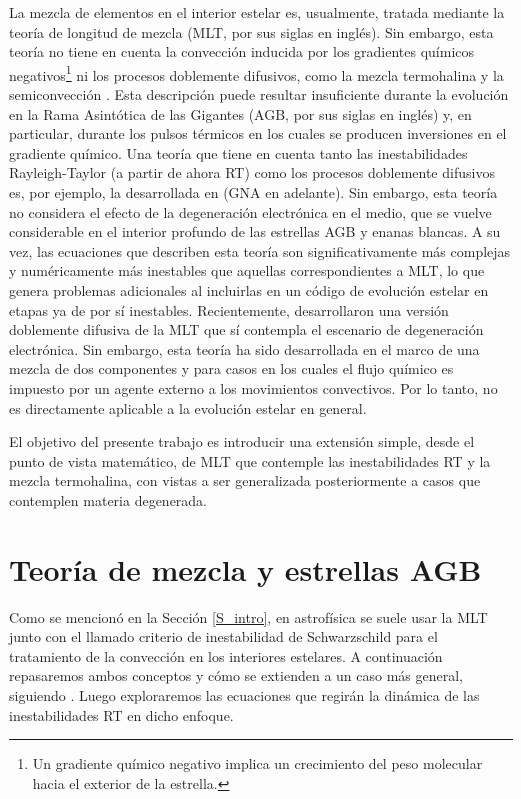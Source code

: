 \documentclass[baaa]{baaa}
\begin{document}
La mezcla de elementos en el interior estelar es, usualmente, tratada mediante la teoría de longitud de mezcla (MLT, por sus siglas en inglés). Sin embargo, esta teoría no tiene en cuenta la convección inducida por los gradientes químicos negativos\footnote{Un gradiente químico negativo implica un crecimiento del peso molecular hacia el exterior de la estrella.} ni los procesos doblemente difusivos, como la mezcla termohalina y la semiconvección \citep{Kipphenhahn2013}. Esta descripción puede resultar insuficiente durante la evolución en la Rama Asintótica de las Gigantes (AGB, por sus siglas en inglés) y, en particular, durante los pulsos térmicos en los cuales se producen inversiones en el gradiente químico. Una teoría que tiene en cuenta tanto las inestabilidades Rayleigh-Taylor (a partir de ahora RT) como los procesos doblemente difusivos es, por ejemplo, la desarrollada en \cite{1993ApJ...407..284G,1996MNRAS.283.1165G} (GNA en adelante). Sin embargo, esta teoría no considera el efecto de la degeneración electrónica en el medio, que se vuelve considerable en el interior profundo de las estrellas AGB y enanas blancas. A su vez, las ecuaciones que describen esta teoría son significativamente más complejas y numéricamente más inestables que aquellas correspondientes a MLT, lo que genera problemas adicionales al incluirlas en un código de evolución estelar en etapas ya de por sí inestables. Recientemente, \cite{2024ApJ...969...10C} desarrollaron una versión doblemente difusiva de la MLT que sí contempla el escenario de degeneración electrónica. Sin embargo, esta teoría ha sido desarrollada en el marco de una mezcla de dos componentes y para casos en los cuales el flujo químico es impuesto por un agente externo a los movimientos convectivos. Por lo tanto, no es directamente aplicable a la evolución estelar en general.

El objetivo del presente trabajo es introducir una extensión simple, desde el punto de vista matemático, de MLT que contemple las inestabilidades RT y la mezcla termohalina, con vistas a ser generalizada posteriormente a casos que contemplen materia degenerada. 

\section{Teoría de mezcla y estrellas AGB}

Como se mencionó en la Sección \ref{S_intro}, en astrofísica se suele usar la MLT junto con el llamado criterio de inestabilidad de Schwarzschild para el tratamiento de la convección en los interiores estelares. A continuación repasaremos ambos conceptos y cómo se extienden a un caso más general, siguiendo {\cite{Kipphenhahn2013}}. Luego exploraremos las ecuaciones que regirán la dinámica de las inestabilidades RT en dicho enfoque. 
\end{document}
